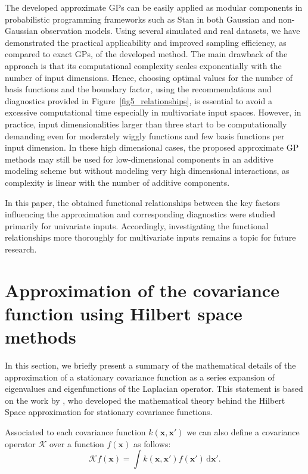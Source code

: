 The developed approximate GPs can be easily applied as modular components in probabilistic programming frameworks such as Stan in both Gaussian and non-Gaussian observation models. Using several simulated and real datasets, we have demonstrated the practical applicability and improved sampling efficiency, as compared to exact GPs, of the developed method. The main drawback of the approach is that its computational complexity scales exponentially with the number of input dimensions. Hence, choosing optimal values for the number of basis functions and the boundary factor, using the recommendations and diagnostics provided in Figure~\ref{fig5_relationships}, is essential to avoid a excessive computational time especially in multivariate input spaces. However, in practice, input dimensionalities larger than three start to be computationally demanding even for moderately wiggly functions and few basis functions per input dimension. In these high dimensional cases, the proposed approximate GP methods may still be used for low-dimensional components in an additive modeling scheme but without modeling very high dimensional interactions, as complexity is linear with the number of additive components.

In this paper, the obtained functional relationships between the key factors influencing the approximation and corresponding diagnostics were studied primarily for univariate inputs. Accordingly, investigating the functional relationships more thoroughly for multivariate inputs remains a topic for future research. 


\appendix


\section{Approximation of the covariance function using Hilbert space methods} \label{app_approx_covfun}

In this section, we briefly present a summary of the mathematical details of the approximation of a stationary covariance function as a series expansion of eigenvalues and eigenfunctions of the Laplacian operator. This statement is based on the work by \citet{solin2018hilbert}, who developed the mathematical theory behind the Hilbert Space approximation for stationary covariance functions.

Associated to each covariance function $k(\bm{x},\bm{x}')$ we can also define a covariance operator $\mathcal{K}$ over a function $f(\bm{x})$ as follows:
%
\begin{equation*}
\mathcal{K} f(\bm{x}) = \int k(\bm{x},\bm{x}') f(\bm{x}') \,\mathrm{d}\bm{x}'.
\end{equation*} 

